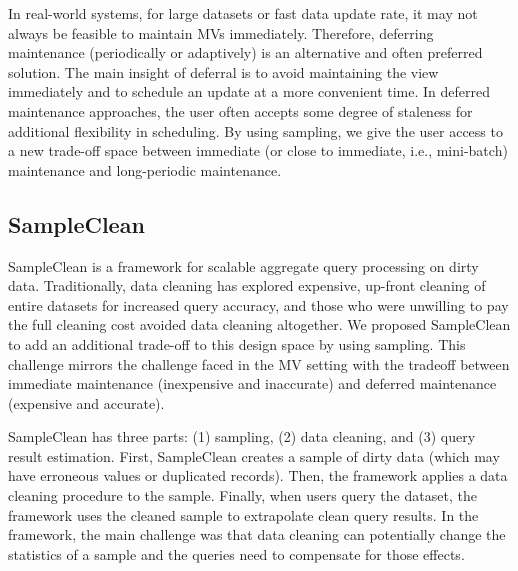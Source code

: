 In real-world systems, for large datasets or fast data update rate, it may not always be feasible to maintain MVs immediately. 
Therefore, deferring maintenance (periodically or adaptively) is an alternative and often preferred solution.
The main insight of deferral is to avoid maintaining the view immediately and to schedule an update at a more convenient time.
In deferred maintenance approaches, the user often accepts some degree of staleness for additional flexibility in scheduling.
By using sampling, we give the user access to a new trade-off space between immediate (or close to immediate, i.e., mini-batch) maintenance and long-periodic maintenance.

\fi


\subsection{SampleClean~\cite{wang1999sample}}
SampleClean is a framework for scalable aggregate query processing on dirty data.
Traditionally, data cleaning has explored expensive, up-front cleaning of entire datasets for increased query accuracy, and those who were unwilling to pay the full cleaning cost avoided data cleaning altogether.
We proposed SampleClean to add an additional trade-off to this design space by using sampling.
This challenge mirrors the challenge faced in the MV setting with the tradeoff between immediate maintenance (inexpensive and inaccurate) and deferred maintenance (expensive and accurate).

SampleClean has three parts: (1) sampling, (2) data cleaning, and (3) query result estimation.
First, SampleClean creates a sample of dirty data (which may have erroneous values or duplicated records). %
Then, the framework applies a data cleaning procedure to the sample.
Finally, when users query the dataset, the framework uses the cleaned sample to extrapolate clean query results.
In the framework, the main challenge was that data cleaning can potentially change the statistics of a sample and the queries need to compensate for those effects.

